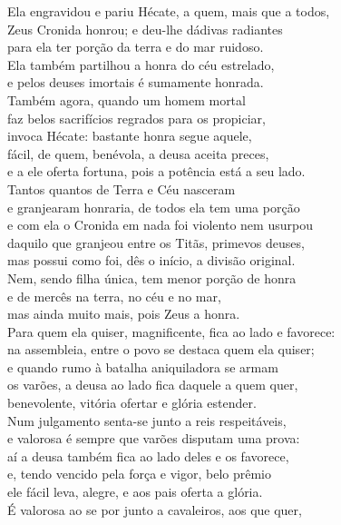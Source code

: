 \begin{pages}
\begin{Rightside}
\quad{}Ela engravidou e pariu Hécate, a quem, mais que a todos,\\
Zeus Cronida honrou; e deu-lhe dádivas radiantes\\
para ela ter porção da terra e do mar ruidoso.\\
Ela também partilhou a honra do céu estrelado,\\
e pelos deuses imortais é sumamente honrada. \\
Também agora, quando um homem mortal\\
faz belos sacrifícios regrados para os propiciar,\\
invoca Hécate: bastante honra segue aquele,\\
fácil, de quem, benévola, a deusa aceita preces,\\
e a ele oferta fortuna, pois a potência está a seu lado. \\
Tantos quantos de Terra e Céu nasceram\\
e granjearam honraria, de todos ela tem uma porção\\
e com ela o Cronida em nada foi violento nem usurpou\\
daquilo que granjeou entre os Titãs, primevos deuses,\\
mas possui como foi, dês o início, a divisão original. \\
Nem, sendo filha única, tem menor porção de honra\\
e de mercês na terra, no céu e no mar,\\
mas ainda muito mais, pois Zeus a honra.\\
Para quem ela quiser, magnificente, fica ao lado e favorece:\\
na assembleia, entre o povo se destaca quem ela quiser; \\
e quando rumo à batalha aniquiladora se armam\\
os varões, a deusa ao lado fica daquele a quem quer,\\
benevolente, vitória ofertar e glória estender.\\
Num julgamento senta-se junto a reis respeitáveis,\\
e valorosa é sempre que varões disputam uma prova: \\
aí a deusa também fica ao lado deles e os favorece,\\
e, tendo vencido pela força e vigor, belo prêmio\\
ele fácil leva, alegre, e aos pais oferta a glória.\\
É valorosa ao se por junto a cavaleiros, aos que quer,\\

\end{Rightside}
\end{pages}
